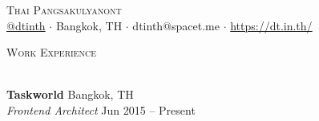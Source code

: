 \documentclass[a4paper]{article}
\newcommand{\lineunder} {
    \vspace*{-8pt} \\
    \hspace*{-18pt} \hrulefill \\
}
\newcommand{\header} [1] {
    {\hspace*{-18pt}\vspace*{6pt} \textsc{#1}}
    \vspace*{-6pt} \lineunder
}
\begin{document}
\vspace*{-40pt}

\vspace*{-10pt}
\begin{center}
	{\Huge \scshape {Thai Pangsakulyanont}}\\ \vspace{4pt}
	\href{https://github.com/dtinth}{@dtinth} $\cdot$ Bangkok, TH $\cdot$ dtinth@spacet.me $\cdot$ \url{https://dt.in.th/}\\
\end{center}

\header{Work Experience}
\vspace{1mm}




\textbf{Taskworld} \hfill Bangkok, TH\\
\textit{Frontend Architect} \hfill Jun 2015 – Present\\
\vspace{-1mm}
\end{document}

